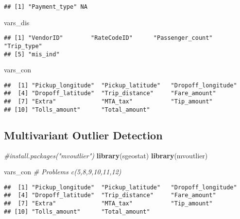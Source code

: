 \documentclass[]{article}
\newenvironment{Shaded}{\begin{snugshade}}{\end{snugshade}}
\newcommand{\KeywordTok}[1]{\textcolor[rgb]{0.13,0.29,0.53}{\textbf{{#1}}}}
\newcommand{\CommentTok}[1]{\textcolor[rgb]{0.56,0.35,0.01}{\textit{{#1}}}}
\newcommand{\NormalTok}[1]{{#1}}
\begin{document}
\begin{verbatim}
## [1] "Payment_type" NA
\end{verbatim}

\begin{Shaded}
\begin{Highlighting}[]
\NormalTok{vars_dis}
\end{Highlighting}
\end{Shaded}

\begin{verbatim}
## [1] "VendorID"        "RateCodeID"      "Passenger_count" "Trip_type"      
## [5] "mis_ind"
\end{verbatim}

\begin{Shaded}
\begin{Highlighting}[]
\NormalTok{vars_con}
\end{Highlighting}
\end{Shaded}

\begin{verbatim}
##  [1] "Pickup_longitude"  "Pickup_latitude"   "Dropoff_longitude"
##  [4] "Dropoff_latitude"  "Trip_distance"     "Fare_amount"      
##  [7] "Extra"             "MTA_tax"           "Tip_amount"       
## [10] "Tolls_amount"      "Total_amount"
\end{verbatim}

\subsection{Multivariant Outlier
Detection}\label{multivariant-outlier-detection}

\begin{Shaded}
\begin{Highlighting}[]
\CommentTok{#install.packages("mvoutlier")}
\KeywordTok{library}\NormalTok{(sgeostat)}
\KeywordTok{library}\NormalTok{(mvoutlier)}

\NormalTok{vars_con }\CommentTok{# Problems c(5,8,9,10,11,12)}
\end{Highlighting}
\end{Shaded}

\begin{verbatim}
##  [1] "Pickup_longitude"  "Pickup_latitude"   "Dropoff_longitude"
##  [4] "Dropoff_latitude"  "Trip_distance"     "Fare_amount"      
##  [7] "Extra"             "MTA_tax"           "Tip_amount"       
## [10] "Tolls_amount"      "Total_amount"
\end{verbatim}
\end{document}
